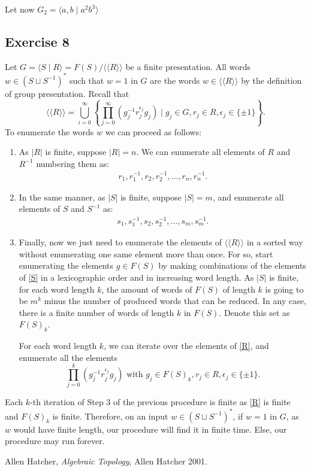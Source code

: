 \documentclass[11pt,a4paper]{article}
\begin{document}
Let now $ G_2 = \langle a, b \mid a^2 b^3 \rangle $

\subsection*{Exercise 8}
Let $ G = \langle S \mid R \rangle = F(S) / \langle \langle R \rangle \rangle $ be a finite presentation. All words $ w \in (S \sqcup S^{-1})^* $ such that $ w = 1 $ in $ G $ are the words $ w \in \langle \langle R \rangle \rangle $ by the definition of group presentation. Recall that
$$
  \langle \langle R \rangle \rangle = \bigcup_{i=0}^\infty \left\{ \prod_{j=0}^\infty (g_j^{-1} r_j^{\epsilon_j} g_j) \mid g_j \in G, r_j \in R, \epsilon_j \in \{ \pm 1 \} \right\}.
$$
To enumerate the words $ w $ we can proceed as follows:
\begin{enumerate}
  \item As $ |R| $ is finite, suppose $ |R| = n $. We can enumerate all elements of $ R $ and $ R^{-1} $ numbering them as:
  \begin{align} \label{R}
    r_1, r_1^{-1}, r_2, r_2^{-1}, \dots, r_n, r_n^{-1}.
  \end{align}
  
  \item In the same manner, as $ |S| $ is finite, suppose $ |S| = m $, and enumerate all elements of $ S $ and $ S^{-1} $ as:
  \begin{align} \label{S}
    s_1, s_1^{-1}, s_2, s_2^{-1}, \dots, s_m, s_m^{-1}.
  \end{align}

  \item Finally, now we just need to enumerate the elements of $ \langle \langle R \rangle \rangle $ in a sorted way without enumerating one same element more than once. For so, start enumerating the elements $ g \in F(S) $ by making combinations of the elements of \eqref{S} in a lexicographic order and in increasing word length. As $|S|$ is finite, for each word length $ k $, the amount of words of $ F(S) $ of length $ k $ is going to be $ m ^k $ minus the number of produced words that can be reduced. In any case, there is a finite number of words of length $ k $ in $ F(S) $. Denote this set as  $ F(S)_k $.
  
  For each word length $ k $, we can iterate over the elements of \eqref{R}, and enumerate all the elements
  $$
  \prod_{j=0}^k (g_j^{-1} r_j^{\epsilon_j} g_j) \text{ with } g_j \in F(S)_k, r_j \in R, \epsilon_j \in \{ \pm 1 \}.
  $$

\end{enumerate}

Each $k$-th iteration of Step 3 of the previous procedure is finite as \eqref{R} is finite and $ F(S)_k $ is finite. Therefore, on an input $ w \in (S \sqcup S^{-1})^* $, if $ w = 1 $ in $ G $, as $ w $ would have finite length, our procedure will find it in finite time. Else, our procedure may run forever.

\begin{thebibliography}{9}

  Allen Hatcher,
  \textit{Algebraic Topology},
  Allen Hatcher 2001.
  
\end{thebibliography}
\end{document}
